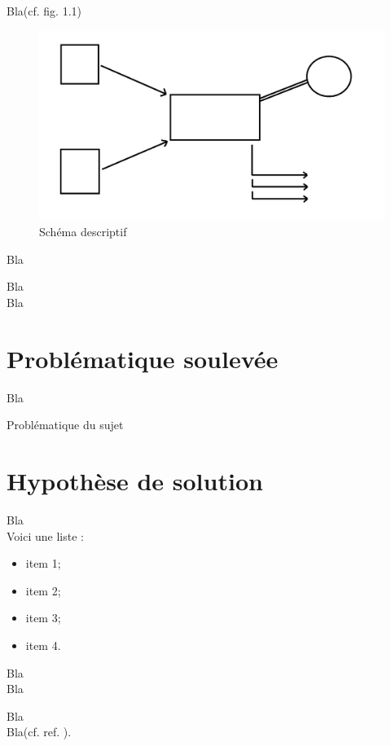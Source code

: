 Bla(cf. fig. 1.1)\\

\begin{figure}[!h]
\begin{center}
\includegraphics[width=15cm]{presentation/schema}
\end{center}
\caption{Schéma descriptif}
\end{figure}

{}

Bla

Bla\\

Bla

\newpage

\section{Problématique soulevée}

Bla

\begin{center}
Problématique du sujet
\end{center}

\section{Hypothèse de solution}

Bla\\

Voici une liste :
\begin{itemize}
\item item 1;
\item item 2;
\item item 3;
\item item 4.
\end{itemize}

Bla\\

Bla

Bla\footnotemark\\

Bla(cf. ref. \cite{cite6}).

